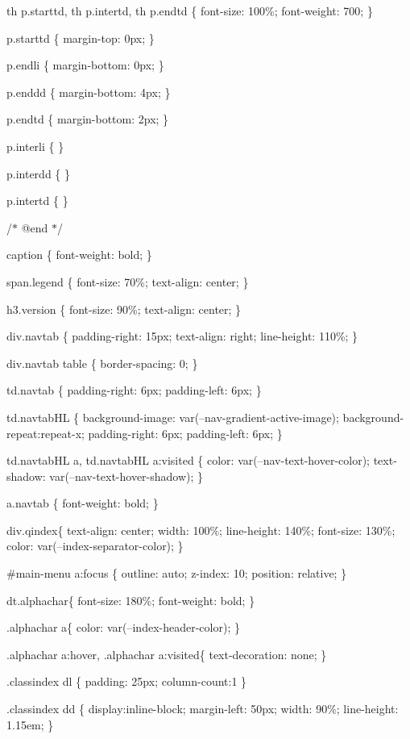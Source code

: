 th p.\+starttd, th p.\+intertd, th p.\+endtd \{ font-\/size\+: 100\%; font-\/weight\+: 700; \}

p.\+starttd \{ margin-\/top\+: 0px; \}

p.\+endli \{ margin-\/bottom\+: 0px; \}

p.\+enddd \{ margin-\/bottom\+: 4px; \}

p.\+endtd \{ margin-\/bottom\+: 2px; \}

p.\+interli \{ \}

p.\+interdd \{ \}

p.\+intertd \{ \}

/\texorpdfstring{$\ast$}{*} @end \texorpdfstring{$\ast$}{*}/

caption \{ font-\/weight\+: bold; \}

span.\+legend \{ font-\/size\+: 70\%; text-\/align\+: center; \}

h3.\+version \{ font-\/size\+: 90\%; text-\/align\+: center; \}

div.\+navtab \{ padding-\/right\+: 15px; text-\/align\+: right; line-\/height\+: 110\%; \}

div.\+navtab table \{ border-\/spacing\+: 0; \}

td.\+navtab \{ padding-\/right\+: 6px; padding-\/left\+: 6px; \}

td.\+navtab\+HL \{ background-\/image\+: var(--nav-\/gradient-\/active-\/image); background-\/repeat\+:repeat-\/x; padding-\/right\+: 6px; padding-\/left\+: 6px; \}

td.\+navtab\+HL a, td.\+navtab\+HL a\+:visited \{ color\+: var(--nav-\/text-\/hover-\/color); text-\/shadow\+: var(--nav-\/text-\/hover-\/shadow); \}

a.\+navtab \{ font-\/weight\+: bold; \}

div.\+qindex\{ text-\/align\+: center; width\+: 100\%; line-\/height\+: 140\%; font-\/size\+: 130\%; color\+: var(--index-\/separator-\/color); \}

\#main-\/menu a\+:focus \{ outline\+: auto; z-\/index\+: 10; position\+: relative; \}

dt.\+alphachar\{ font-\/size\+: 180\%; font-\/weight\+: bold; \}

.alphachar a\{ color\+: var(--index-\/header-\/color); \}

.alphachar a\+:hover, .alphachar a\+:visited\{ text-\/decoration\+: none; \}

.classindex dl \{ padding\+: 25px; column-\/count\+:1 \}

.classindex dd \{ display\+:inline-\/block; margin-\/left\+: 50px; width\+: 90\%; line-\/height\+: 1.\+15em; \}


